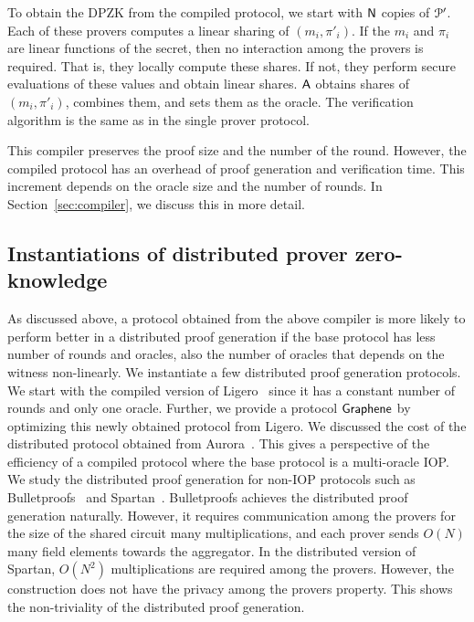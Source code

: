 To obtain the DPZK from the compiled protocol, we start with $\mathsf{N}$ copies of $\mathcal{P}'$. Each of these provers computes a linear sharing of $(m_i, \pi'_i)$. If the $m_i$ and $\pi_i$ are linear functions of the secret, then no interaction among the provers is required. That is, they locally compute these shares. If not, they perform secure evaluations of these values and obtain linear shares. $\mathsf{A}$ obtains shares of $(m_i, \pi'_i)$, combines them, and sets them as the oracle. The verification algorithm is the same as in the single prover protocol. 

This compiler preserves the proof size and the number of the round. However, the compiled protocol has an overhead of proof generation and verification time. This increment depends on the oracle size and the number of rounds. In Section~\ref{sec:compiler}, we discuss this in more detail.


\subsection{Instantiations of distributed prover zero-knowledge}
As discussed above, a protocol obtained from the above compiler is more likely to perform better in a distributed proof generation if the base protocol has less number of rounds and oracles, also the number of oracles that depends on the witness non-linearly. We instantiate a few distributed proof generation protocols. We start with the compiled version of Ligero~\cite{ligero} since it has a constant number of rounds and only one oracle. Further, we provide a protocol $\textsf{Graphene}$ by optimizing this newly obtained protocol from Ligero. 
We discussed the cost of the distributed protocol obtained from Aurora~\cite{aurora}. This gives a perspective of the efficiency of a compiled protocol where the base protocol is a multi-oracle IOP.
We study the distributed proof generation for non-IOP protocols such as Bulletproofs~\cite{bulletproofs} and Spartan~\cite{spartan}. Bulletproofs achieves the distributed proof generation naturally. However, it requires communication among the provers for the size of the shared circuit many multiplications, and each prover sends $O(N)$ many field elements towards the aggregator. In the distributed version of Spartan, $O(N^2)$ multiplications are required among the provers. However, the construction does not have the privacy among the provers property. This shows the non-triviality of the distributed proof generation. 


